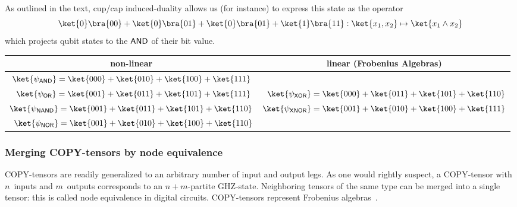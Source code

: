 As outlined in the text, cup/cap induced-duality allows us (for instance) to express this state as the operator
$$ 
\ket{0}\bra{00}+\ket{0}\bra{01}+\ket{0}\bra{01}+\ket{1}\bra{11}:\ket{x_1,x_2} \mapsto\ket{x_1\wedge x_2}
$$
which projects qubit states to the $\text{\sf AND}$ of their bit value.

\begin{center}
\begin{table}[ht]
\begin{tabular}{|c|c|}\hline
non-linear & linear (Frobenius Algebras) \\\hline
$\ket{\psi_\AND}=\ket{000}+\ket{010}+\ket{100}+\ket{111}$ &  \\
~$\ket{\psi_\OR}=\ket{001}+\ket{011}+\ket{101}+\ket{111}$ &
~$\ket{\psi_\XOR}=\ket{000}+\ket{011}+\ket{101}+\ket{110}$\\
$\ket{\psi_\NAND}=\ket{001}+\ket{011}+\ket{101}+\ket{110}$ &
$\ket{\psi_\XNOR}=\ket{001}+\ket{010}+\ket{100}+\ket{111}$\\
~$\ket{\psi_\NOR}=\ket{001}+\ket{010}+\ket{100}+\ket{110}$ & \\\hline
\end{tabular}
\end{table}\label{fig:BooleanStates}
\end{center}



\subsubsection{Merging {\sf COPY}-tensors by node equivalence}
{\sf COPY}-tensors are readily generalized to an arbitrary number of input and
output legs. As one would rightly suspect,
a {\sf COPY}-tensor with $n$~inputs and $m$~outputs corresponds to an
$n+m$-partite {\sf GHZ}-state.  Neighboring tensors of the same type can be merged into
a single tensor: this is called node equivalence in digital circuits. {\sf
COPY}-tensors represent Frobenius algebras~\cite{Carboni-Walters,FA}.

